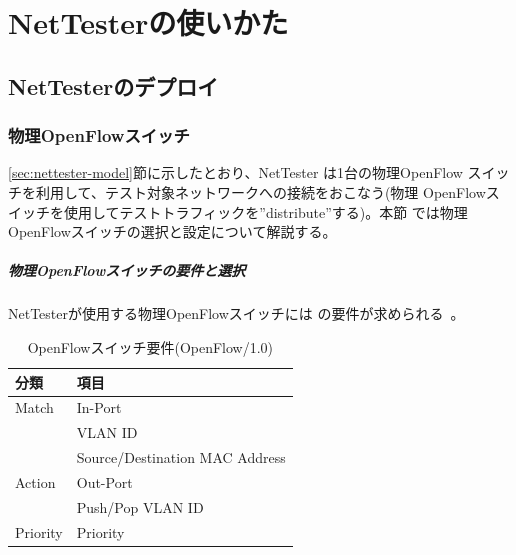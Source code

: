 
\chapter{NetTesterの使いかた}
\label{chap:nettester-usage}

 \section{NetTesterのデプロイ}
 \label{sec:nettester-deployment}

  \subsection{物理OpenFlowスイッチ}
  \label{sec:nettester-deploy-psw}


\ref{sec:nettester-model}節に示したとおり、NetTester は1台の物理OpenFlow
スイッチを利用して、テスト対象ネットワークへの接続をおこなう(物理
OpenFlowスイッチを使用してテストトラフィックを''distribute''する)。本節
では物理OpenFlowスイッチの選択と設定について解説する。

    \paragraph{物理OpenFlowスイッチの要件と選択}
NetTesterが使用する物理OpenFlowスイッチには
の要件が求められる~\cite{l1pjpoc}。

\begin{table}[h]
 \centering
 \caption{OpenFlowスイッチ要件(OpenFlow/1.0)}
 \label{tab:ofs-requirement}
 \begin{tabular}{l|l}
  \hline
  分類 & 項目 \\
  \hline
  \hline
  Match  & In-Port \\ \cline{2-2}
         & VLAN ID \\ \cline{2-2}
         & Source/Destination MAC Address \\ \hline
  Action & Out-Port \\ \cline{2-2}
         & Push/Pop VLAN ID \\ \hline
  Priority & Priority \\
  \hline
 \end{tabular}
\end{table}

